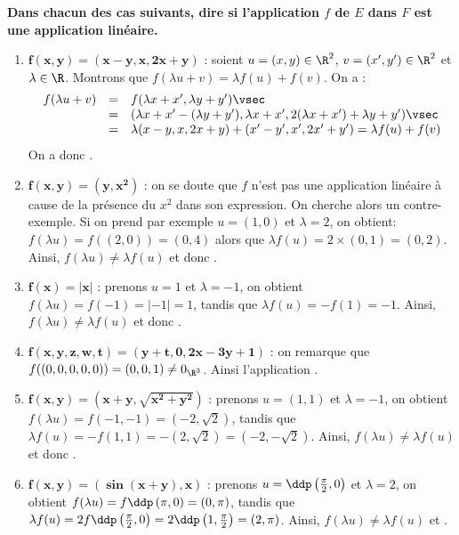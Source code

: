 \documentclass[a4paper, 11pt,reqno]{article}
\begin{document}
\begin{correction}  \;
	\textbf{Dans chacun des cas suivants, dire si l'application $f$ de $E$ dans $F$ est une application lin\'eaire.}
	\begin{enumerate}
		\item $\mathbf{f(x,y)=(x-y,x,2x+y)}$ : soient $u=(x,y) \in \R^2$, $v=(x',y') \in \R^2$ et $\lambda \in \R$. Montrons que $f(\lambda u + v) = \lambda f(u) + f(v)$. On a :
		      $$\begin{array}{rcl}
				      f(\lambda u + v) & = & f(\lambda x + x', \lambda y + y') \vsec                                                      \\
				                       & = & (\lambda x + x' - (\lambda y + y'), \lambda x + x', 2(\lambda x + x') + \lambda y + y')\vsec \\
				                       & = & \lambda (x-y,x,2x+y) + (x'-y',x',2x'+y') = \lambda f(u) + f(v)
			      \end{array}$$
		      On a donc .
		\item $\mathbf{f(x,y)=(y,x^2)}$ : on se doute que $f$ n'est pas une application lin\'eaire \`a cause de la pr\'esence du $x^2$ dans son expression. On cherche alors un contre-exemple.
		      Si on prend par exemple $u=(1,0)$ et $\lambda=2$, on obtient: $f(\lambda u)=f( (2,0))=(0,4)$ alors que $\lambda f(u)=2\times (0,1)=(0,2)$. Ainsi, $f(\lambda u)\not=\lambda f(u)$ et donc .
		\item $\mathbf{f(x)=|x|}$ : prenons $u=1$ et $\lambda = -1$, on obtient $f(\lambda u) = f(-1)=|-1| = 1$, tandis que $\lambda f(u) = - f(1) = -1$. Ainsi, $f(\lambda u)\not=\lambda f(u)$ et donc .
		\item $\mathbf{f(x,y,z,w,t)=(y+t,0,2x-3y+1)}$ : on remarque que $f((0,0,0,0,0))=(0,0,1)\not= 0_{\R^3}$. Ainsi l'application .
		\item $\mathbf{f(x,y)=(x+y,\sqrt{x^2+y^2})}$ : prenons $u=(1,1)$ et $\lambda = -1$, on obtient $f(\lambda u) = f(-1,-1)=(-2,\sqrt{2})$, tandis que $\lambda f(u) = - f(1,1) = -(2,\sqrt{2}) = (-2, -\sqrt{2})$. Ainsi, $f(\lambda u)\not=\lambda f(u)$ et donc .
		\item $\mathbf{f(x,y)=(\sin{(x+y)},x)}$ : prenons $u=\ddp\left(\frac{\pi}{2},0\right)$ et $\lambda = 2$, on obtient $f(\lambda u) = f\ddp\left(\pi,0\right)=(0,\pi)$, tandis que $\lambda f(u) = 2 f\ddp\left(\frac{\pi}{2},0\right) = 2\ddp\left(1,\frac{\pi}{2}\right) = (2, \pi)$. Ainsi, $f(\lambda u)\not=\lambda f(u)$ et .
	\end{enumerate}
\end{correction}
\end{document}

